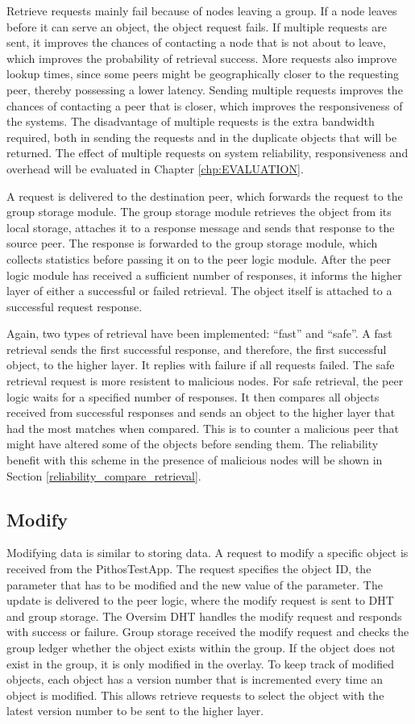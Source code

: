     Retrieve requests mainly fail because of nodes leaving a group. If a node leaves before it can serve an object, the object request fails. If multiple requests are sent, it improves the chances of contacting a node that is not about to leave, which improves the probability of retrieval success. More requests also improve lookup times, since some peers might be geographically closer to the requesting peer, thereby possessing a lower latency. Sending multiple requests improves the chances of contacting a peer that is closer, which improves the responsiveness of the systems. The disadvantage of multiple requests is the extra bandwidth required, both in sending the requests and in the duplicate objects that will be returned. The effect of multiple requests on system reliability, responsiveness and overhead will be evaluated in Chapter \ref{chp:EVALUATION}.

    A request is delivered to the destination peer, which forwards the request to the group storage module. The group storage module retrieves the object from its local storage, attaches it to a response message and sends that response to the source peer. The response is forwarded to the group storage module, which collects statistics before passing it on to the peer logic module. After the peer logic module has received a sufficient number of responses, it informs the higher layer of either a successful or failed retrieval. The object itself is attached to a successful request response.

    Again, two types of retrieval have been implemented: ``fast'' and ``safe''. A fast retrieval sends the first successful response, and therefore, the first successful object, to the higher layer. It replies with failure if all requests failed. The safe retrieval request is more resistent to malicious nodes. For safe retrieval, the peer logic waits for a specified number of responses. It then compares all objects received from successful responses and sends an object to the higher layer that had the most matches when compared. This is to counter a malicious peer that might have altered some of the objects before sending them. The reliability benefit with this scheme in the presence of malicious nodes will be shown in Section \ref{reliability_compare_retrieval}.
\subsection{Modify}
   Modifying data is similar to storing data. A request to modify a specific object is received from the PithosTestApp. The request specifies the object ID, the parameter that has to be modified and the new value of the parameter. The update is delivered to the peer logic, where the modify request is sent to DHT and group storage. The Oversim DHT handles the modify request and responds with success or failure. Group storage received the modify request and checks the group ledger whether the object exists within the group. If the object does not exist in the group, it is only modified in the overlay. To keep track of modified objects, each object has a version number that is incremented every time an object is modified. This allows retrieve requests to select the object with the latest version number to be sent to the higher layer.

